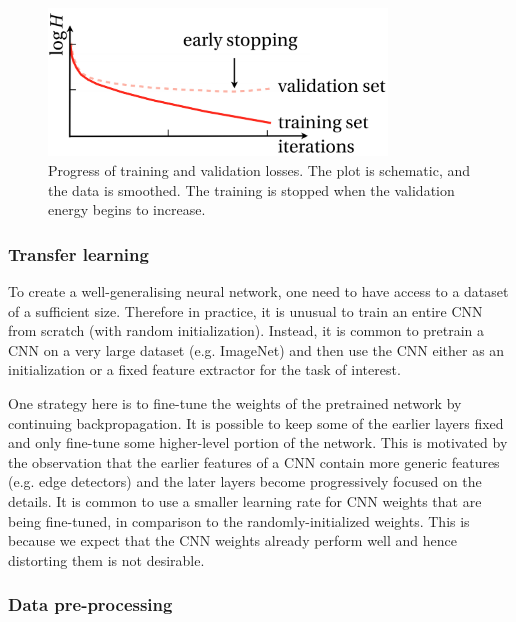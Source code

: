 \vspace{4mm}
\begin{figure}[htb]
	\begin{center}
		\includegraphics*[width=9cm, keepaspectratio]{obr/early.png}
	\end{center}
	\vspace{4mm}
	\caption{Progress of training and validation losses. The plot is schematic, and
	the data is smoothed. The training is stopped when the validation energy begins to
	increase. \cite{mehlig}} 
	\label{}
\end{figure}

\subsubsection{Transfer learning}

To create a well-generalising neural network, one need to have access to a dataset of a sufficient size. Therefore in practice, it is unusual to train an entire CNN from scratch (with random initialization). Instead, it is common to pretrain a CNN on a very large dataset (e.g. ImageNet) and then use the CNN either as an initialization or a fixed feature extractor for the task of interest. \cite{stanford-L7}

One strategy here is to fine-tune the weights of the pretrained network by continuing backpropagation. It is possible to keep some of the earlier layers fixed and only fine-tune some higher-level portion of the network. This is motivated by the observation that the earlier features of a CNN contain more generic features (e.g. edge detectors) and the later layers become progressively focused on the details. It is common to use a smaller learning rate for CNN weights that are being fine-tuned, in comparison to the randomly-initialized weights. This is because we expect that the CNN weights already perform well and hence distorting them is not desirable. \cite{stanford-L7} \cite{stanford-github}

\subsubsection{Data pre-processing}

